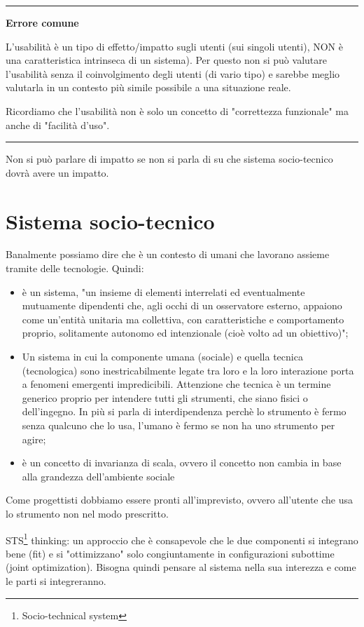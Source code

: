 \documentclass[11pt,a4paper]{book}
\begin{document}
\noindent\rule{\textwidth}{1pt}
\begin{center}
	\textbf{Errore comune}
\end{center}

L'usabilità è un tipo di effetto/impatto sugli utenti (sui singoli utenti), NON è una caratteristica intrinseca di un sistema). Per questo non si può valutare l'usabilità senza il coinvolgimento degli utenti (di vario tipo) e sarebbe meglio valutarla in un contesto più simile possibile a una situazione reale.

Ricordiamo che l'usabilità non è solo un concetto di "correttezza funzionale" ma anche di "facilità d'uso".

\noindent\rule{\textwidth}{1pt}

Non si può parlare di impatto se non si parla di su che sistema socio-tecnico dovrà avere un impatto.
\section{Sistema socio-tecnico}
Banalmente possiamo dire che è un contesto di umani che lavorano assieme tramite delle tecnologie. Quindi:
\begin{itemize}
	\item è un sistema, "un insieme di elementi interrelati ed eventualmente mutuamente dipendenti che, agli occhi di un osservatore esterno, appaiono come un'entità unitaria ma collettiva, con caratteristiche e comportamento proprio, solitamente autonomo ed intenzionale (cioè volto ad un obiettivo)";
	\item Un sistema in cui la componente umana  (sociale) e quella tecnica (tecnologica) sono inestricabilmente legate tra loro e la loro interazione porta a fenomeni emergenti impredicibili. Attenzione che tecnica è un termine generico proprio per intendere tutti gli strumenti, che siano fisici o dell'ingegno. In più si parla di interdipendenza perchè lo strumento è fermo senza qualcuno che lo usa, l'umano è fermo se non ha uno strumento per agire;
	\item è un concetto di invarianza di scala, ovvero il concetto non cambia in base alla grandezza dell'ambiente sociale
\end{itemize}
Come progettisti dobbiamo essere pronti all'imprevisto, ovvero all'utente che usa lo strumento non nel modo prescritto.

STS\footnote{Socio-technical system} thinking: un approccio che è consapevole che le due componenti si integrano bene (fit) e si "ottimizzano" solo congiuntamente in configurazioni subottime (joint optimization). Bisogna quindi pensare al sistema nella sua interezza e come le parti si integreranno.
\end{document}
